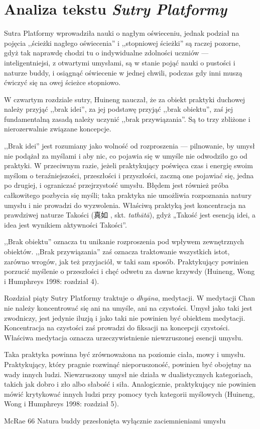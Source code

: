 \chapter{Analiza tekstu \textit{Sutry Platformy}}

Sutra Platformy wprowadziła nauki o nagłym oświeceniu, jednak podział na pojęcia ,,ścieżki nagłego oświecenia'' i ,,stopniowej ścieżki'' są raczej pozorne, gdyż tak naprawdę chodzi tu o indywidualne zdolności uczniów --- inteligentniejsi, z otwartymi umysłami, są w stanie pojąć nauki o pustości i naturze buddy, i osiągnąć oświecenie w jednej chwili, podczas gdy inni muszą ćwiczyć się na owej ścieżce stopniowo.

W czwartym rozdziale sutry, Huineng nauczał, że za obiekt praktyki duchowej należy przyjąć ,,brak idei'', za jej podstawę przyjąć ,,brak obiektu'', zaś jej fundamentalną zasadą należy uczynić ,,brak przywiązania''. Są to trzy zbliżone i nierozerwalnie związane koncepcje.

,,Brak idei'' jest rozumiany jako wolność od rozproszenia --- pilnowanie, by umysł nie podążał za myślami i aby nic, co pojawia się w umyśle nie odwodziło go od praktyki. W przeciwnym razie, jeżeli praktykujący poświęca czas i energię swoim myślom o teraźniejszości, przeszłości i przyszłości, zaczną one pojawiać się, jedna po drugiej, i ograniczać przejrzystość umysłu. Błędem jest również próba całkowitego pozbycia się myśli; taka praktyka nie umożliwia rozpoznania natury umysłu i nie prowadzi do wyzwolenia. Właściwą praktyką jest koncentracja na prawdziwej naturze Takości (真如 , skt. \textit{tathātā}), gdyż „Takość jest esencją idei, a idea jest wynikiem aktywności Takości”.

,,Brak obiektu'' oznacza tu unikanie rozproszenia pod wpływem zewnętrznych obiektów. ,,Brak przywiązania'' zaś oznacza traktowanie wszystkich istot, zarówno wrogów, jak też przyjaciół, w taki sam sposób. Praktykujący powinien porzucić myślenie o przeszłości i chęć odwetu za dawne krzywdy (Huineng, Wong i Humphreys 1998: rozdział 4).

Rozdział piąty Sutry Platformy traktuje o \textit{dhyāna}, medytacji. W medytacji Chan nie należy koncentrować się ani na umyśle, ani na czystości. Umysł jako taki jest zwodniczy, jest jedynie iluzją i jako taki nie powinien być obiektem medytacji. Koncentracja na czystości zaś prowadzi do fiksacji na koncepcji czystości. Właściwa medytacja oznacza urzeczywistnienie niewzruszonej esencji umysłu.

Taka praktyka powinna być zrównoważona na poziomie ciała, mowy i umysłu. Praktykujący, który pragnie rozwinąć nieporuszoność, powinien być obojętny na wady innych ludzi. Niewzruszony umysł nie działa w dualistycznych kategoriach, takich jak dobro i zło albo słabość i siła. Analogicznie, praktykujący nie powinien mówić krytykować innych ludzi przy pomocy tych kategorii myślowych (Huineng, Wong i Humphreys 1998: rozdział 5).

McRae 66
Natura buddy przesłonięta wyłącznie zaciemnieniami umysłu


\fi
